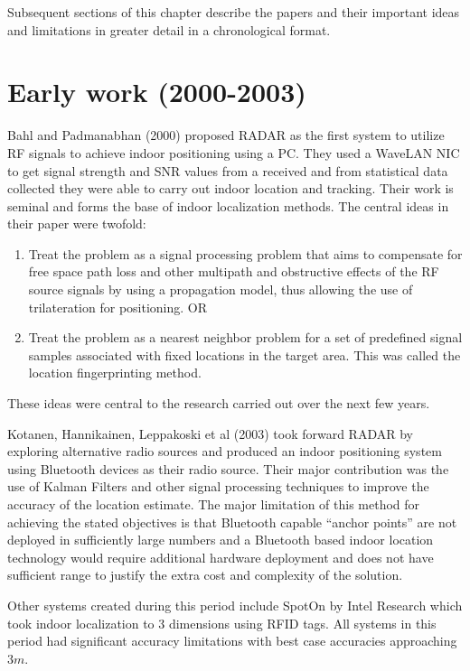 Subsequent sections of this chapter describe the papers and their important
ideas and limitations in greater detail in a chronological format.

\section{Early work (2000-2003)}

Bahl and Padmanabhan\cite{RADAR} (2000) proposed RADAR as the first system to utilize RF signals to achieve indoor positioning using a PC. They used a WaveLAN NIC to get signal strength and SNR values from a received and from statistical data collected they were able to carry out indoor location and tracking. Their work is seminal and forms the base of indoor localization 
methods. The central ideas in their paper were twofold:

\begin{enumerate}
\item Treat the problem as a signal processing problem that aims to compensate for free space path loss and other multipath and obstructive effects of the RF source signals by using a propagation model, thus allowing the use of trilateration for positioning. OR
\item Treat the problem as a nearest neighbor problem for a set of predefined signal samples associated with fixed locations in the target area. This was called the location fingerprinting method.
\end{enumerate}

These ideas were central to the research carried out over the next few years.

Kotanen, Hannikainen, Leppakoski et al\cite{Kotanen} (2003) took forward RADAR by exploring alternative radio sources and produced an indoor positioning system using Bluetooth devices as their radio source. Their major contribution was the use of Kalman Filters and other signal processing techniques to improve the accuracy of the location estimate. The major limitation of this method for achieving the stated objectives is that Bluetooth capable “anchor points” are not deployed in sufficiently large numbers and a Bluetooth based indoor location technology would require additional hardware deployment and does not have sufficient range to justify the extra cost and complexity of the solution.

Other systems created during this period include SpotOn\cite{SpotON} by Intel Research which took indoor localization to 3 dimensions using RFID tags. All systems in this period had significant accuracy limitations with best case accuracies 
approaching $3 m$.

